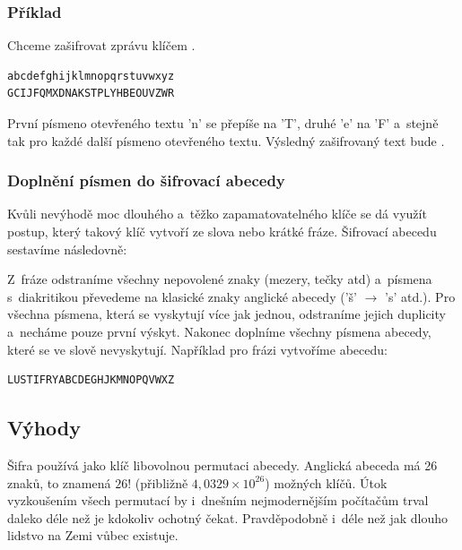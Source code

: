 \documentclass[glossaries, index]{kidiplom}
\begin{document}
\subsubsection{Příklad}
Chceme zašifrovat zprávu  klíčem .

\begin{center}
\begin{BVerbatim}
abcdefghijklmnopqrstuvwxyz
GCIJFQMXDNAKSTPLYHBEOUVZWR
\end{BVerbatim}
\end{center}

První písmeno otevřeného textu 'n' se přepíše na 'T', druhé 'e' na 'F' a~stejně tak pro každé další písmeno otevřeného textu. Výsledný zašifrovaný text bude .

\subsubsection{Doplnění písmen do šifrovací abecedy}
Kvůli nevýhodě moc dlouhého a~těžko zapamatovatelného klíče se dá využít postup, který takový klíč vytvoří ze slova nebo krátké fráze. Šifrovací abecedu sestavíme následovně:

Z~fráze odstraníme všechny nepovolené znaky (mezery, tečky atd) a~písmena s~diakritikou převedeme na klasické znaky anglické abecedy ('š' $\to$ 's' atd.). Pro všechna písmena, která se vyskytují více jak jednou, odstraníme jejich duplicity a~necháme pouze první výskyt. Nakonec doplníme všechny písmena abecedy, které se ve slově nevyskytují. Například pro frázi  vytvoříme abecedu:

\begin{center}
\begin{BVerbatim}
LUSTIFRYABCDEGHJKMNOPQVWXZ
\end{BVerbatim}
\end{center}

\subsection{Výhody}
Šifra používá jako klíč libovolnou permutaci abecedy. Anglická abeceda má 26 znaků, to znamená $26!$ (přibližně $4,0329 \times 10^{26}$) možných klíčů. Útok vyzkoušením všech permutací by i~dnešním nejmodernějším počítačům trval daleko déle než je kdokoliv ochotný čekat. Pravděpodobně i~déle než jak dlouho lidstvo na Zemi vůbec existuje.
\end{document}
